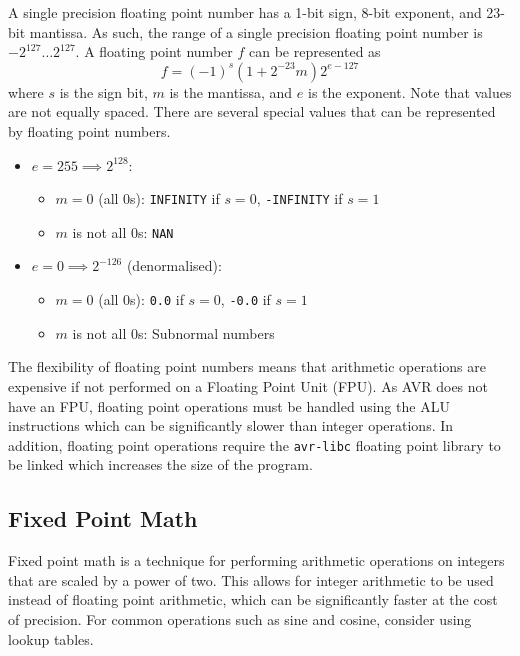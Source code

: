 \documentclass[a4paper]{report}
\begin{document}
A single precision floating point number has a 1-bit sign, 8-bit exponent, and 23-bit mantissa.
As such, the range of a single precision floating point number is \(-2^{127} \ldots 2^{127}\).
A floating point number \(f\) can be represented as
\begin{equation*}
    f = \left( -1 \right)^s \left( 1 + 2^{-23} m \right) 2^{e - 127}
\end{equation*}
where \(s\) is the sign bit, \(m\) is the mantissa, and \(e\) is the exponent.
Note that values are not equally spaced. There are several special values that
can be represented by floating point numbers.
\begin{itemize}
    \item \(e = 255 \implies 2^{128}\):
          \begin{itemize}
              \item \(m = 0\) (all 0s): \texttt{INFINITY} if \(s = 0\), \texttt{-INFINITY} if \(s = 1\)
              \item \(m\) is not all 0s: \texttt{NAN}
          \end{itemize}
    \item \(e = 0 \implies 2^{-126}\) (denormalised):
          \begin{itemize}
              \item \(m = 0\) (all 0s): \texttt{0.0} if \(s = 0\), \texttt{-0.0} if \(s = 1\)
              \item \(m\) is not all 0s: Subnormal numbers
          \end{itemize}
\end{itemize}
The flexibility of floating point numbers means that arithmetic operations
are expensive if not performed on a Floating Point Unit (FPU). As AVR does not have an FPU, floating point operations
must be handled using the ALU instructions which can be significantly slower than integer operations.
In addition, floating point operations require the \texttt{avr-libc} floating point library to be linked
which increases the size of the program.
\subsection{Fixed Point Math}
Fixed point math is a technique for performing arithmetic operations on integers
that are scaled by a power of two. This allows for integer arithmetic to be used
instead of floating point arithmetic, which can be significantly faster
at the cost of precision.
For common operations such as sine and cosine, consider using lookup tables.
\end{document}
